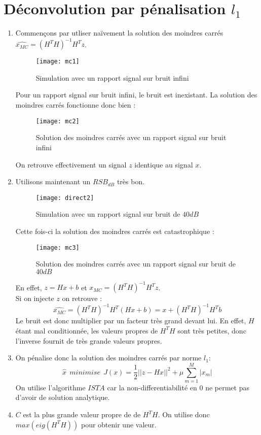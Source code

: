 \documentclass[12pt,a4paper,titlepage]{article}
\begin{document}
\section{Déconvolution par pénalisation $l_1$}
	\begin{enumerate}
		\item{Commençons par utliser naïvement la solution des moindres carrés $\hat{x_{MC}}=(H^TH)^{-1}H^Tz$.
		\begin{figure}[H]
    			\texttt{[image: mc1]}
		    	\centering
			\caption{Simulation avec un rapport signal sur bruit infini}
		\end{figure}
		Pour un rapport signal sur bruit infini, le bruit est inexistant. La solution des moindres carrés fonctionne donc bien :
		\begin{figure}[H]
    			\texttt{[image: mc2]}
		    	\centering
			\caption{Solution des moindres carrés avec un rapport signal sur bruit infini}
		\end{figure}
		On retrouve effectivement un signal $z$ identique au signal $x$.
		}
		\item{Utilisons maintenant un $RSB_{dB}$ très bon.
		\begin{figure}[H]
    			\texttt{[image: direct2]}
		    	\centering
			\caption{Simulation avec un rapport signal sur bruit de $40dB$}
		\end{figure}
		Cette fois-ci la solution des moindres carrés est catastrophique :
		\begin{figure}[H]
    			\texttt{[image: mc3]}
		    	\centering
			\caption{Solution des moindres carrés avec un rapport signal sur bruit de $40dB$}
		\end{figure}
		En effet, $z=Hx+b$ et $\hat{x_{MC}}=(H^TH)^{-1}H^Tz$. \\
		Si on injecte $z$ on retrouve :
		$$
		\hat{x_{MC}}=(H^TH)^{-1}H^T(Hx+b)=x+(H^TH)^{-1}H^Tb
		$$
		Le bruit est donc multiplier par un facteur très grand devant lui. En effet, $H$ étant mal conditionnée, les valeurs propres de $H^TH$ sont très petites, donc l'inverse fournit de très grande valeurs propres.
		}
		\item{
		On pénalise donc la solution des moindres carrés par norme $l_1$:
		$$
		\hat{x} \ \ minimise \ \ J(x) = \frac{1}{2}|| z-Hx ||^2+ \mu \sum_{m=1}^M|x_m|
		$$
		On utilise l'algorithme $ISTA$ car la non-differentiabilité en $0$ ne permet pas d'avoir de solution analytique.
		}
		\item{$C$ est la plus grande valeur propre de de $H^TH$. On utilise donc $max(eig(H^TH))$ pour obtenir une valeur.}

\end{enumerate}
\end{document}
